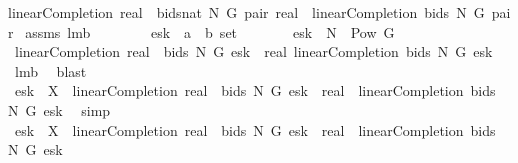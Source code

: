 \begin{isabellebody}
linearCompletion{\isacharprime}\ {\isacharparenleft}real\ {\isasymcirc}\ {\isacharparenleft}bids{\isacharcolon}{\isacharcolon}{\isacharunderscore}{\isacharequal}{\isachargreater}nat{\isacharparenright}{\isacharparenright}\ N\ G\ pair{\isacharequal}\ {\isacharparenleft}real\ {\isasymcirc}\ {\isacharparenleft}linearCompletion{\isacharprime}\ bids\ N\ G{\isacharparenright}{\isacharparenright}\ pair{\isachardoublequoteclose}\isanewline
%
\isadelimproof
%
\endisadelimproof
%
\isatagproof
{}\isamarkupfalse%
\ assms\ lm{}{}{}b\ \isanewline
{}\isamarkupfalse%
\ {\isacharminus}\isanewline
\ \ \isacommand{{\isacharbraceleft}}\isamarkupfalse%
\ \isamarkupfalse%
\ esk{}{}\ {\isacharcolon}{\isacharcolon}\ {\isachardoublequoteopen}{\isacharprime}a\ {\isasymtimes}\ {\isacharprime}b\ set{\isachardoublequoteclose}\isanewline
\ \ \ \ \isacommand{{\isacharbraceleft}}\isamarkupfalse%
\ \isamarkupfalse%
\ {\isachardoublequoteopen}esk{}{}\ {\isasymin}\ N\ {\isasymtimes}\ {\isacharparenleft}Pow\ G\ {\isacharminus}\ {\isacharbraceleft}{\isacharbraceleft}{\isacharbraceright}{\isacharbraceright}{\isacharparenright}{\isachardoublequoteclose}\isanewline
\ \ \ \ \ \ \isamarkupfalse%
\ {\isachardoublequoteopen}linearCompletion{\isacharprime}\ {\isacharparenleft}real\ {\isasymcirc}\ bids{\isacharparenright}\ N\ G\ esk{}{}\ {\isacharequal}\ real\ {\isacharparenleft}linearCompletion{\isacharprime}\ bids\ N\ G\ esk{}{}\ \isamarkupfalse%
\ lm{}{}{}b\ \isamarkupfalse%
\ blast\isanewline
\ \ \ \ \ \ \isamarkupfalse%
\ {\isachardoublequoteopen}esk{}{}\ {\isasymnotin}\ X\ {\isasymor}\ linearCompletion{\isacharprime}\ {\isacharparenleft}real\ {\isasymcirc}\ bids{\isacharparenright}\ N\ G\ esk{}{}\ {\isacharequal}\ {\isacharparenleft}real\ {\isasymcirc}\ linearCompletion{\isacharprime}\ bids\ N\ G{\isacharparenright}\ esk{}{}\ \isamarkupfalse%
\ simp\ \isacommand{{\isacharbraceright}}\isamarkupfalse%
\isanewline
\ \ \ \ \isamarkupfalse%
\ {\isachardoublequoteopen}esk{}{}\ {\isasymnotin}\ X\ {\isasymor}\ linearCompletion{\isacharprime}\ {\isacharparenleft}real\ {\isasymcirc}\ bids{\isacharparenright}\ N\ G\ esk{}{}\ {\isacharequal}\ {\isacharparenleft}real\ {\isasymcirc}\ linearCompletion{\isacharprime}\ bids\ N\ G{\isacharparenright}\ esk{}{}\ \isamarkupfalse%

\end{isabellebody}
